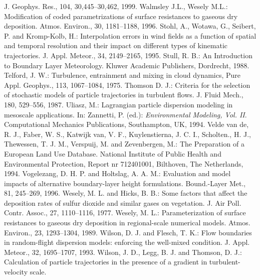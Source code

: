 \documentclass{egu}                  %
\begin{document}
\begin{thebibliography}{}
J. Geophys. Res., 104, 30,445--30,462, 1999.
Walmsley J.L., Wesely M.L.: 
Modification of coded parametrizations of surface resistances to gaseous dry deposition.  
Atmos. Environ., 30, 1181--1188, 1996. 
Stohl, A., Wotawa, G., Seibert, P. and Kromp-Kolb, H.:
Interpolation errors in wind fields as a function of spatial and temporal resolution and their impact on different types of kinematic trajectories.
J. Appl. Meteor., 34, 2149--2165, 1995.
Stull, R. B.:
An Introduction to Boundary Layer Meteorology. Kluwer Academic Publishers, Dordrecht, 1988.
Telford, J. W.:
Turbulence, entrainment and mixing in cloud dynamics,
Pure Appl. Geophys., 113, 1067--1084, 1975.
Thomson D. J.:
Criteria for the selection of stochastic models of particle trajectories in turbulent flows.
J. Fluid Mech., 180, 529--556, 1987.
Uliasz, M.:
Lagrangian particle dispersion modeling in mesoscale applications. In: Zannetti, P. (ed.): {\it Environmental Modeling, Vol. II}. Computational Mechanics Publications, Southampton, UK, 1994.
Velde van de, R. J., Faber, W. S., Katwijk van, V. F., Kuylenstierna, J. C. I., Scholten., H. J., Thewessen, T. J. M., Verspuij, M. and Zevenbergen, M.:
The Preparation of a European Land Use Database. National Institute of Public Health and Environmental Protection, Report nr 712401001, Bilthoven, The Netherlands, 1994.
Vogelezang, D. H. P. and Holtslag, A. A. M.:
Evaluation and model impacts of alternative boundary-layer height formulations.
Bound.-Layer Met., 81, 245--269, 1996.
Wesely, M. L. and Hicks, B. B.:
Some factors that affect the deposition rates of sulfur dioxide and similar gases on vegetation.
J. Air Poll. Contr. Assoc., 27, 1110--1116, 1977.
Wesely, M. L.:
Parameterization of surface resistances to gaseous dry deposition in regional-scale numerical models.
Atmos. Environ., 23, 1293--1304, 1989.
Wilson, D. J. and Flesch, T. K.:
Flow boundaries in random-flight dispersion models: enforcing the well-mixed condition.
J. Appl. Meteor., 32, 1695--1707, 1993.
Wilson, J. D., Legg, B. J. and Thomson, D. J.:
Calculation of particle trajectories in the presence of a gradient in turbulent-velocity scale.

\end{thebibliography}
\end{document}
